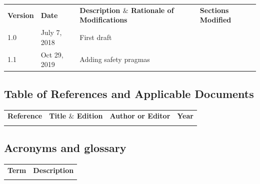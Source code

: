 \documentclass[12pt]{article}
\begin{document}
\begin{table}[H]
\large
\centering
\begin{adjustbox}{width=\textwidth}
\begin{tabular}{ |p{1.5cm}|p{2.5cm}|p{9.0cm}|p{3.0cm}| }
\hhline{----}
\textbf{Version} & \textbf{Date} & \textbf{Description  $  \&  $  Rationale of
Modifications} & \textbf{Sections Modified} \\
\hhline{----}
1.0 & July 7, 2018 & First draft &  \\ 
\hline
1.1 & Oct 29, 2019 & Adding safety pragmas &  \\ 
\hline
\end{tabular}
\end{adjustbox}
\end{table}

\subsection{Table of References and Applicable Documents}

\begin{table}[H]
\large
\centering
\begin{adjustbox}{width=\textwidth}
\begin{tabular}{ |p{2.66in}|p{2.66in}|p{0.95in}|p{0.43in}| }
\hhline{----}
\textbf{Reference} & \textbf{Title  $  \&  $  Edition} & \textbf{Author or
Editor} & \textbf{Year}
\\
\hhline{----}
 &  &  &  \\ 
\hline
\end{tabular}
\end{adjustbox}
\end{table}

\subsection{Acronyms and glossary}

\begin{table}[H]
\large
\centering
\begin{adjustbox}{width=\textwidth}
\begin{tabular}{ |p{1.24in}|p{5.45in}| }
\hhline{--}
\textbf{Term} & \textbf{Description} \\ 
\hhline{--}
 &  \\ 
\hline
\end{tabular}
\end{adjustbox}
\end{table}
\end{document}

